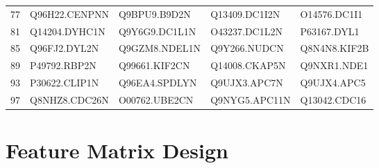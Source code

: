 \begin{table}[H]
\begin{tabular}{p{0.5cm}p{1.5cm}p{1.5cm}p{1.5cm}p{1.5cm}}
 77 & Q96H22.CENPNN &  Q9BPU9.B9D2N &  Q13409.DC1I2N &  O14576.DC1I1\\  
 81 & Q14204.DYHC1N &  Q9Y6G9.DC1L1N &  O43237.DC1L2N &  P63167.DYL1\\   
 85 & Q96FJ2.DYL2N &  Q9GZM8.NDEL1N &  Q9Y266.NUDCN &  Q8N4N8.KIF2B\\  
 89 & P49792.RBP2N &  Q99661.KIF2CN &  Q14008.CKAP5N &  Q9NXR1.NDE1\\   
 93 & P30622.CLIP1N &  Q96EA4.SPDLYN &  Q9UJX3.APC7N &  Q9UJX4.APC5\\   
 97 & Q8NHZ8.CDC26N &  O00762.UBE2CN &  Q9NYG5.APC11N &  Q13042.CDC16\\  
\hline 
\end{tabular}
\end{table}

\section{Feature Matrix Design}

